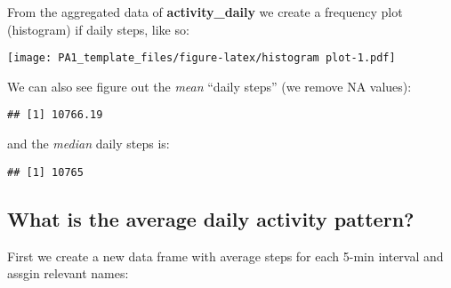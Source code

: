 \documentclass[]{article}
\newenvironment{Shaded}{\begin{snugshade}}{\end{snugshade}}
\newcommand{\KeywordTok}[1]{\textcolor[rgb]{0.13,0.29,0.53}{\textbf{#1}}}
\newcommand{\DataTypeTok}[1]{\textcolor[rgb]{0.13,0.29,0.53}{#1}}
\newcommand{\StringTok}[1]{\textcolor[rgb]{0.31,0.60,0.02}{#1}}
\newcommand{\OtherTok}[1]{\textcolor[rgb]{0.56,0.35,0.01}{#1}}
\newcommand{\OperatorTok}[1]{\textcolor[rgb]{0.81,0.36,0.00}{\textbf{#1}}}
\newcommand{\NormalTok}[1]{#1}
\begin{document}
From the aggregated data of \textbf{activity\_daily} we create a
frequency plot (histogram) if daily steps, like so:

\begin{Shaded}
\end{Shaded}

\texttt{[image: PA1\_template\_files/figure-latex/histogram plot-1.pdf]}

We can also see figure out the \emph{mean} ``daily steps'' (we remove NA
values):

\begin{Shaded}
\end{Shaded}

\begin{verbatim}
## [1] 10766.19
\end{verbatim}

and the \emph{median} daily steps is:

\begin{Shaded}
\end{Shaded}

\begin{verbatim}
## [1] 10765
\end{verbatim}

\subsection{What is the average daily activity
pattern?}\label{what-is-the-average-daily-activity-pattern}

First we create a new data frame with average steps for each 5-min
interval and assgin relevant names:

\begin{Shaded}
\end{Shaded}
\end{document}
